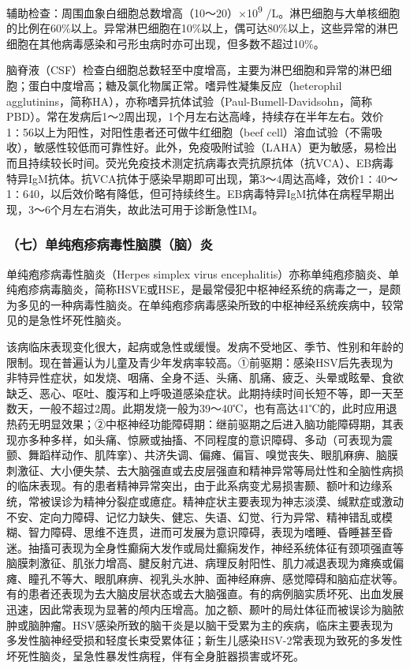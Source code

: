 辅助检查：周围血象白细胞总数增高（10～20）×10\textsuperscript{9}
/L。淋巴细胞与大单核细胞的比例在60\%以上。异常淋巴细胞在10\%以上，偶可达80\%以上，这些异常的淋巴细胞在其他病毒感染和弓形虫病时亦可出现，但多数不超过10\%。

脑脊液（CSF）检查白细胞总数轻至中度增高，主要为淋巴细胞和异常的淋巴细胞；蛋白中度增高；糖及氯化物属正常。嗜异性凝集反应（heterophil
agglutinins，简称HA），亦称嗜异抗体试验（Paul-Bumell-Davidsohn，简称PBD）。常在发病后1～2周出现，1个月左右达高峰，持续存在半年左右。效价1∶56以上为阳性，对阳性患者还可做牛红细胞（beef
cell）溶血试验（不需吸收），敏感性较低而可靠性好。此外，免疫吸附试验（LAHA）更为敏感，易检出而且持续较长时间。荧光免疫技术测定抗病毒衣壳抗原抗体（抗VCA）、EB病毒特异IgM抗体。抗VCA抗体于感染早期即可出现，第3～4周达高峰，效价1∶40～1∶640，以后效价略有降低，但可持续终生。EB病毒特异IgM抗体在病程早期出现，3～6个月左右消失，故此法可用于诊断急性IM。

\subsubsection{（七）单纯疱疹病毒性脑膜（脑）炎}

单纯疱疹病毒性脑炎（Herpes simplex virus
encephalitis）亦称单纯疱疹脑炎、单纯疱疹病毒脑炎，简称HSVE或HSE，是最常侵犯中枢神经系统的病毒之一，是颇为多见的一种病毒性脑炎。在单纯疱疹病毒感染所致的中枢神经系统疾病中，较常见的是急性坏死性脑炎。

该病临床表现变化很大，起病或急性或缓慢。发病不受地区、季节、性别和年龄的限制。现在普遍认为儿童及青少年发病率较高。①前驱期：感染HSV后先表现为非特异性症状，如发烧、咽痛、全身不适、头痛、肌痛、疲乏、头晕或眩晕、食欲缺乏、恶心、呕吐、腹泻和上呼吸道感染症状。此期持续时间长短不等，即一天至数天，一般不超过2周。此期发烧一般为39～40℃，也有高达41℃的，此时应用退热药无明显效果；②中枢神经功能障碍期：继前驱期之后进入脑功能障碍期，其表现亦多种多样，如头痛、惊厥或抽搐、不同程度的意识障碍、多动（可表现为震颤、舞蹈样动作、肌阵挛）、共济失调、偏瘫、偏盲、嗅觉丧失、眼肌麻痹、脑膜刺激征、大小便失禁、去大脑强直或去皮层强直和精神异常等局灶性和全脑性病损的临床表现。有的患者精神异常突出，由于此系病变尤易损害颞、额叶和边缘系统，常被误诊为精神分裂症或癔症。精神症状主要表现为神志淡漠、缄默症或激动不安、定向力障碍、记忆力缺失、健忘、失语、幻觉、行为异常、精神错乱或模糊、智力障碍、思维不连贯，进而可发展为意识障碍，表现为嗜睡、昏睡甚至昏迷。抽搐可表现为全身性癫痫大发作或局灶癫痫发作，神经系统体征有颈项强直等脑膜刺激征、肌张力增高、腱反射亢进、病理反射阳性、肌力减退表现为瘫痪或偏瘫、瞳孔不等大、眼肌麻痹、视乳头水肿、面神经麻痹、感觉障碍和脑疝症状等。有的患者还表现为去大脑皮层状态或去大脑强直。有的病例脑实质坏死、出血发展迅速，因此常表现为显著的颅内压增高。加之额、颞叶的局灶体征而被误诊为脑脓肿或脑肿瘤。HSV感染所致的脑干炎是以脑干受累为主的疾病，临床主要表现为多发性脑神经受损和轻度长束受累体征；新生儿感染HSV-2常表现为致死的多发性坏死性脑炎，呈急性暴发性病程，伴有全身脏器损害或坏死。


